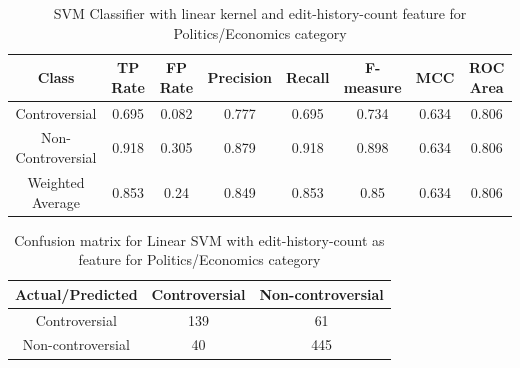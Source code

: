 \documentclass[twocolumn]{article}
\begin{document}
 
 
 \begin{table}[ht]
	{ 	\centering
		\hfill{}
 	\begin{tabular}{|c|c|c|c|c|c|c|c|}
 		\hline
 		\textbf{Class} & \textbf{TP Rate} & \textbf{FP Rate} & \textbf{Precision} & \textbf{Recall} & \textbf{F-measure} & \textbf{MCC} & \textbf{ROC Area} \\
 		\hline
 		\hline
 		Controversial & 0.695 & 0.082 & 0.777 & 0.695 & 0.734 & 0.634 & 0.806 \\
 		Non-Controversial & 0.918 & 0.305 & 0.879 & 0.918 & 0.898 & 0.634 & 0.806\\
 		Weighted Average & 0.853 & 0.24 & 0.849 & 0.853 & 0.85 & 0.634 & 0.806 \\
 		\hline
 	\end{tabular}}
 	\hfill{}
 	\centering
 	\caption{SVM Classifier with linear kernel and edit-history-count feature for Politics/Economics category}
 	\label{tab:3}
 \end{table}
 
 \begin{table}[Politics/Economics]
 	\centering
 	\begin{tabular}{|c|c|c|}
 		\hline
 		\textbf{Actual/Predicted} & Controversial &Non-controversial \\
 		\hline
 		Controversial & 139 & 61\\
 		Non-controversial & 40 & 445\\
 		\hline
 	\end{tabular}
 	\caption{Confusion matrix for Linear SVM with edit-history-count as feature for Politics/Economics category}
 	\label{tab:4}
 \end{table}
 
\end{document}
